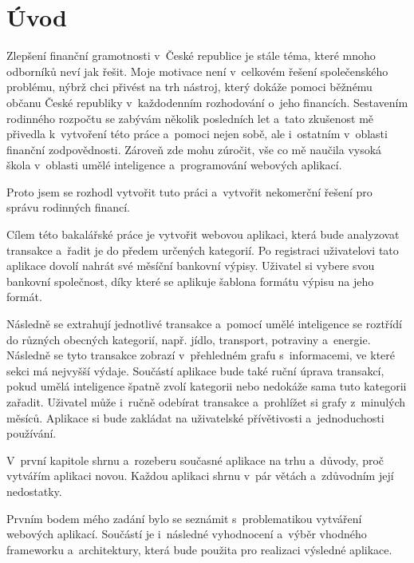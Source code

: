
%

\chapter{Úvod}
Zlepšení finanční gramotnosti v~České republice je stále téma, které mnoho odborníků neví jak řešit. Moje motivace není v~celkovém řešení společenského problému, nýbrž chci přivést na trh nástroj, který dokáže pomoci běžnému občanu České republiky v~každodenním rozhodování o~jeho financích. Sestavením rodinného rozpočtu se zabývám několik posledních let a~tato zkušenost mě přivedla k~vytvoření této práce a~pomoci nejen sobě, ale i~ostatním v~oblasti finanční zodpovědnosti. Zároveň zde mohu zúročit, vše co mě naučila vysoká škola v~oblasti umělé inteligence a~programování webových aplikací.

Proto jsem se rozhodl vytvořit tuto práci a~vytvořit nekomerční řešení pro správu rodinných financí.

Cílem této bakalářské práce je vytvořit webovou aplikaci, která bude analyzovat transakce
a~řadit je do předem určených kategorií. Po registraci uživatelovi tato aplikace dovolí nahrát své měsíční bankovní výpisy. Uživatel si vybere svou bankovní společnost, díky které se aplikuje šablona formátu výpisu na jeho formát.

Následně se extrahují jednotlivé transakce a~pomocí umělé inteligence se roztřídí do různých obecných kategorií, např. jídlo, transport, potraviny a~energie. Následně se tyto transakce zobrazí v~přehledném grafu s~informacemi, ve které sekci má nejvyšší výdaje. 
Součástí aplikace bude také ruční úprava transakcí, pokud umělá inteligence špatně zvolí kategorii nebo nedokáže sama tuto kategorii zařadit. Uživatel může i~ručně odebírat transakce a~prohlížet si grafy z~minulých měsíců. Aplikace si bude zakládat na uživatelské přívětivosti a~jednoduchosti používání.

V~první kapitole shrnu a~rozeberu současné aplikace na trhu a~důvody, proč vytvářím aplikaci novou. Každou aplikaci shrnu v~pár větách a~zdůvodním její nedostatky.

Prvním bodem mého zadání bylo se seznámit s~problematikou vytváření webových aplikací. Součástí je i~následné vyhodnocení a~výběr vhodného frameworku a~architektury, která bude použita pro realizaci výsledné aplikace.

